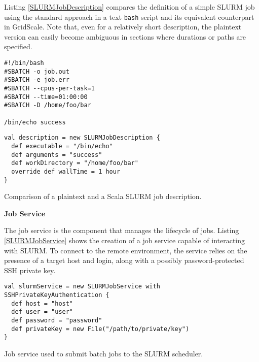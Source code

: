 Listing \ref{SLURMJobDescription} compares the definition of a simple SLURM job using the standard approach in a text \verb|bash| script and its equivalent counterpart in GridScale. Note that, even for a relatively short description, the plaintext version can easily become ambiguous in sections where durations or paths are specified.

\begin{listing}[h]
	\centering
	\begin{minipage}[b]{5.03cm}
		\begin{verbatim}
#!/bin/bash
#SBATCH -o job.out
#SBATCH -e job.err
#SBATCH --cpus-per-task=1 
#SBATCH --time=01:00:00
#SBATCH -D /home/foo/bar

/bin/echo success
        \end{verbatim}
	\end{minipage}
	\hspace{0.5cm}
    \begin{minipage}[b]{8.29cm}
		\begin{verbatim}
val description = new SLURMJobDescription { 
  def executable = "/bin/echo"
  def arguments = "success"
  def workDirectory = "/home/foo/bar"
  override def wallTime = 1 hour
}
		\end{verbatim}
	\end{minipage}
	\caption{Comparison of a plaintext and a Scala SLURM job description.}
	\label{SLURMJobDescription}
\end{listing}

\vspace{3mm}
\textbf{Job Service}
\vspace{1mm}

The job service is the component that manages the lifecycle of jobs. Listing \ref{SLURMJobService} shows the creation of a job service capable of interacting with SLURM. To connect to the remote environment, the service relies on the presence of a target host and login, along with a possibly password-protected SSH private key.

\begin{listing}[h]
	\centering
	\begin{minipage}{14cm}
		\begin{verbatim}
val slurmService = new SLURMJobService with SSHPrivateKeyAuthentication {
  def host = "host"
  def user = "user"
  def password = "password"
  def privateKey = new File("/path/to/private/key")
}
		\end{verbatim}
	\end{minipage}
	\caption{Job service used to submit batch jobs to the SLURM scheduler.}
	\label{SLURMJobService}
\end{listing}

